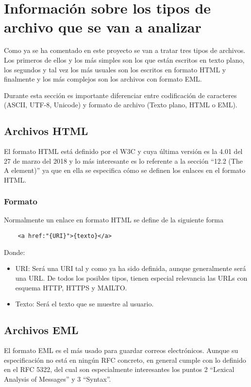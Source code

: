 \section{Información sobre los tipos de archivo que se van a analizar}
Como ya se ha comentado en este proyecto se van a tratar tres tipos de archivos. Los primeros de ellos y los más simples son los que están escritos en texto plano, los segundos y tal vez los más usuales son los escritos en formato HTML y finalmente y los más complejos son los archivos con formato EML.

Durante esta sección es importante diferenciar entre codificación de caracteres (ASCII, UTF-8, Unicode) y formato de archivo (Texto plano, HTML o EML).

\subsection{Archivos HTML}
El formato HTML está definido por el W3C y cuya última versión es la 4.01 del 27 de marzo del 2018 y lo más interesante es lo referente a la sección “12.2 (The A element)” \cite{html_a_tag} ya que en ella se especifica cómo se definen los enlaces en el formato HTML. 

\subsubsection{Formato}
Normalmente un enlace en formato HTML se define de la siguiente forma

\begin{verbatim}
    <a href:"{URI}">{texto}</a>
\end{verbatim}

Donde: 

\begin{itemize}
    \item URI: Será una URI tal y como ya ha sido definida, aunque generalmente será una URL. De todos los posibles tipos, tienen especial relevancia las URLs con esquema HTTP, HTTPS y MAILTO.
    \item Texto: Será el texto que se muestre al usuario.
\end{itemize}

\subsection{Archivos EML}
El formato EML es el más usado para guardar correos electrónicos. Aunque su especificación no está en ningún RFC concreto, en general cumple con lo definido en el RFC 5322\cite{rfc5322}, del cual son especialmente interesantes los puntos 2 “Lexical Analysis of Messages” y 3 “Syntax”. 

